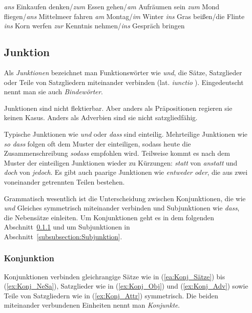 \ea \label{ea:Präp_Verschmelzungen_vorhersagbar}
\ea \label{ea:Präp_Fx_Inf} \textit{ans} Einkaufen denken/\textit{zum} Essen gehen/\textit{am} Aufräumen sein
\ex \label{ex:Präp_Fx_Unikalia} \textit{zum} Mond fliegen/\textit{ans} Mittelmeer fahren
\ex \label{ex:Präp_Fx_Zeit} \textit{am} Montag/\textit{im} Winter
\ex \label{ex:Präp_Fx_Idiom} \textit{ins} Gras beißen/die Flinte \textit{ins} Korn werfen
\ex \label{ex:Präp_Fx_FVG} \textit{zur} Kenntnis nehmen/\textit{ins} Gespräch bringen
\z 
\z 


\subsection{Junktion}\label{subsection:Junktion}

Als \textit{Junktionen} bezeichnet man Funktionswörter wie \textit{und}, die Sätze, Satzglieder oder Teile von Satzgliedern miteinander verbinden (lat. \textit{iunctio} ). Eingedeutscht nennt man sie auch \textit{Bindewörter}.

Junktionen sind nicht flektierbar. Aber anders als Präpositionen regieren sie keinen Kasus. Anders als Adverbien sind sie nicht satzgliedfähig. 

Typische Junktionen wie \textit{und} oder \textit{dass} sind einteilig. Mehrteilige Junktionen wie \textit{so dass} folgen oft dem Muster der einteiligen, sodass heute die Zusammenschreibung \textit{sodass} empfohlen wird. Teilweise kommt es nach dem Muster der einteiligen Junktionen wieder zu Kürzungen: \textit{statt} von \textit{anstatt} und \textit{doch} von \textit{jedoch}. Es gibt auch paarige Junktionen wie \textit{entweder} \textit{oder}, die aus zwei voneinander getrennten Teilen bestehen.

Grammatisch wesentlich ist die Unterscheidung zwischen Konjunktionen, die wie \textit{und} Gleiches symmetrisch miteinander verbinden und Subjunktionen wie \textit{dass}, die Nebensätze einleiten. Um Konjunktionen geht es in dem folgenden Abschnitt~\ref{subsubsection:Konjunktion} und um Subjunktionen in Abschnitt~\ref{subsubsection:Subjunktion}.

\subsubsection{Konjunktion}\label{subsubsection:Konjunktion}

Konjunktionen verbinden gleichrangige Sätze wie in (\ref{ea:Konj_Sätze}) bis (\ref{ex:Konj_NeSa}), Satzglieder wie in (\ref{ex:Konj_Obj}) und (\ref{ex:Konj_Adv}) sowie Teile von Satzgliedern wie in (\ref{ex:Konj_Attr}) symmetrisch. Die beiden miteinander verbundenen Einheiten nennt man \textit{Konjunkte}.

